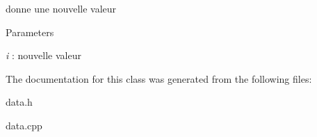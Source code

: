 donne une nouvelle valeur 


\begin{DoxyParams}{Parameters}
\item[{\em i}]: nouvelle valeur \end{DoxyParams}


The documentation for this class was generated from the following files:\begin{DoxyCompactItemize}
\item 
data.h\item 
data.cpp\end{DoxyCompactItemize}
